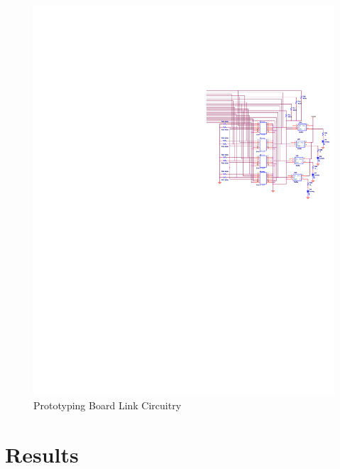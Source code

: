 \begin{figure}[ptb]
	\begin{centering}
		\includegraphics[scale=1.3]{Hardware/Figures/hardware-schematic_links.pdf}
		\caption{Prototyping Board Link Circuitry}
		\label{fig:hardware:schematic_links}
	\end{centering}
\end{figure}

\section{Results}\label{sec:hardware:results}

